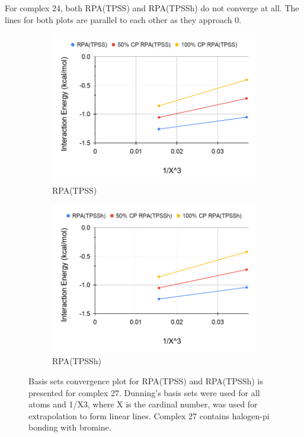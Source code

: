 \documentclass[11pt]{article}
\begin{document}
For complex 24, both RPA(TPSS) and RPA(TPSSh) do not converge at all.
The lines for both plots are parallel to each other as they approach 0.


\begin{figure}[H]
  \centering
  \begin{subfigure}{.5\textwidth}
    \centering
    \includegraphics[scale=0.3]{tpss-27.png}
    \caption{RPA(TPSS)}
    \label{fig:tpss_27}
  \end{subfigure}%
  \begin{subfigure}{.5\textwidth}
    \centering
    \includegraphics[scale=0.3]{tpssh-27.png}
    \caption{RPA(TPSSh)}
    \label{fig:tpssh_27}
  \end{subfigure}
  \caption{Basis sets convergence plot for RPA(TPSS) and RPA(TPSSh) is
    presented for complex 27. Dunning's basis sets were used for all
    atoms and 1/X3, where X is the cardinal number, was used for
    extrapolation to form linear lines. Complex 27 contains halogen-pi
    bonding with bromine.}
  \label{fig:complex_27}
\end{figure}
\end{document}

